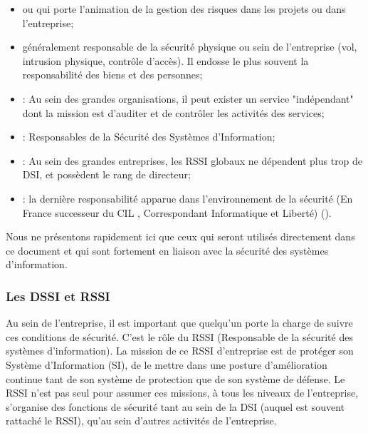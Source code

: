 \begin{frame}
	


\begin{itemize}

 \item {} ou  qui porte l'animation de la gestion des risques dans les projets ou dans l'entreprise;
\item {} généralement responsable de la sécurité physique ou sein de l'entreprise (vol, intrusion physique, contrôle d'accès). Il endosse le plus souvent la responsabilité des biens et des personnes;
\item {} : Au sein des grandes organisations, il peut exister un service "indépendant" dont la mission est d'auditer et de contrôler les activités des services;
\item {} : Responsables de la Sécurité des Systèmes d'Information;
\item {} : Au sein des grandes entreprises, les RSSI globaux ne dépendent plus trop de DSI, et possèdent le rang de directeur;
\item {} : la dernière responsabilité apparue dans l'environnement de la sécurité (En France successeur du CIL , Correspondant Informatique et Liberté) ().

\end{itemize}

\end{frame}

Nous ne présentons rapidement ici que ceux qui seront utilisés directement dans ce document et qui sont fortement en liaison avec la sécurité des systèmes d'information.

\subsubsection{Les DSSI et RSSI}

Au sein de l'entreprise, il est important que quelqu'un porte la charge de suivre ces conditions de sécurité. C'est le rôle du RSSI (Responsable de la sécurité des systèmes d'information).
La mission de ce RSSI d'entreprise est de protéger son Système d'Information (SI), de le mettre dans une posture d'amélioration continue tant de son système de protection que de son système de défense. Le RSSI n'est pas seul pour assumer ces missions, à tous les niveaux de l'entreprise, s'organise des fonctions de sécurité tant au sein de la DSI (auquel est souvent rattaché le RSSI), qu'au sein d'autres activités de l'entreprise. 


